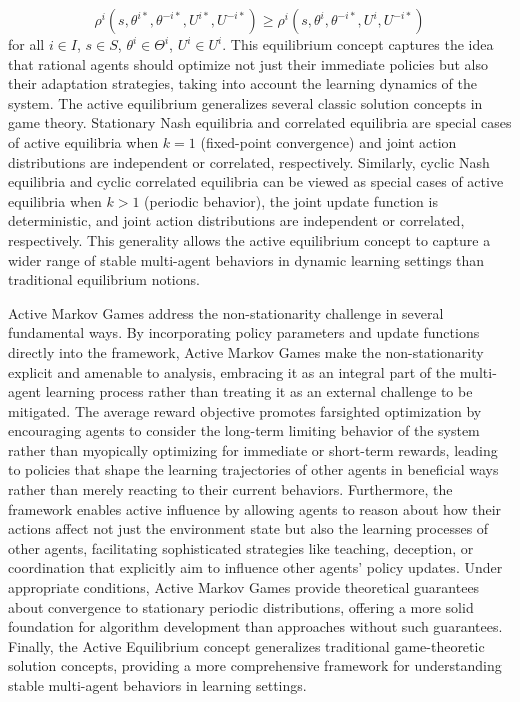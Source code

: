 \begin{equation}
    \rho^i(s, \theta^{i*}, \theta^{-i*}, U^{i*}, U^{-i*}) \geq \rho^i(s, \theta^i, \theta^{-i*}, U^i, U^{-i*})
\end{equation}
for all $i \in I$, $s \in S$, $\theta^i \in \Theta^i$, $U^i \in U^i$. This equilibrium concept captures the idea that rational agents should optimize not just their immediate policies but also their adaptation strategies, taking into account the learning dynamics of the system. The active equilibrium generalizes several classic solution concepts in game theory. Stationary Nash equilibria and correlated equilibria are special cases of active equilibria when $k = 1$ (fixed-point convergence) and joint action distributions are independent or correlated, respectively. Similarly, cyclic Nash equilibria and cyclic correlated equilibria can be viewed as special cases of active equilibria when $k > 1$ (periodic behavior), the joint update function is deterministic, and joint action distributions are independent or correlated, respectively. This generality allows the active equilibrium concept to capture a wider range of stable multi-agent behaviors in dynamic learning settings than traditional equilibrium notions.


Active Markov Games address the non-stationarity challenge in several fundamental ways. By incorporating policy parameters and update functions directly into the framework, Active Markov Games make the non-stationarity explicit and amenable to analysis, embracing it as an integral part of the multi-agent learning process rather than treating it as an external challenge to be mitigated. The average reward objective promotes farsighted optimization by encouraging agents to consider the long-term limiting behavior of the system rather than myopically optimizing for immediate or short-term rewards, leading to policies that shape the learning trajectories of other agents in beneficial ways rather than merely reacting to their current behaviors. Furthermore, the framework enables active influence by allowing agents to reason about how their actions affect not just the environment state but also the learning processes of other agents, facilitating sophisticated strategies like teaching, deception, or coordination that explicitly aim to influence other agents' policy updates. Under appropriate conditions, Active Markov Games provide theoretical guarantees about convergence to stationary periodic distributions, offering a more solid foundation for algorithm development than approaches without such guarantees. Finally, the Active Equilibrium concept generalizes traditional game-theoretic solution concepts, providing a more comprehensive framework for understanding stable multi-agent behaviors in learning settings.


